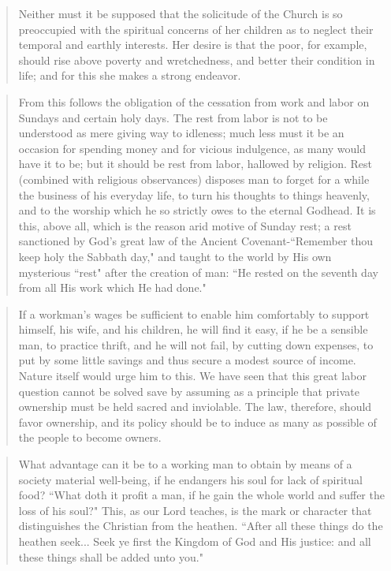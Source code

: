 \begin{quote}
	Neither must it be supposed that the solicitude of the Church is so preoccupied with the spiritual concerns of her children as to neglect their temporal and earthly interests. Her desire is that the poor, for example, should rise above poverty and wretchedness, and better their condition in life; and for this she makes a strong endeavor.
\end{quote}

\begin{quote}
	From this follows the obligation of the cessation from work and labor on Sundays and certain holy days. The rest from labor is not to be understood as mere giving way to idleness; much less must it be an occasion for spending money and for vicious indulgence, as many would have it to be; but it should be rest from labor, hallowed by religion. Rest (combined with religious observances) disposes man to forget for a while the business of his everyday life, to turn his thoughts to things heavenly, and to the worship which he so strictly owes to the eternal Godhead. It is this, above all, which is the reason arid motive of Sunday rest; a rest sanctioned by God's great law of the Ancient Covenant-``Remember thou keep holy the Sabbath day," and taught to the world by His own mysterious ``rest" after the creation of man: ``He rested on the seventh day from all His work which He had done."
\end{quote}

\begin{quote}
	If a workman's wages be sufficient to enable him comfortably to support himself, his wife, and his children, he will find it easy, if he be a sensible man, to practice thrift, and he will not fail, by cutting down expenses, to put by some little savings and thus secure a modest source of income. Nature itself would urge him to this. We have seen that this great labor question cannot be solved save by assuming as a principle that private ownership must be held sacred and inviolable. The law, therefore, should favor ownership, and its policy should be to induce as many as possible of the people to become owners.
\end{quote}

\begin{quote}
	What advantage can it be to a working man to obtain by means of a society material well-being, if he endangers his soul for lack of spiritual food? ``What doth it profit a man, if he gain the whole world and suffer the loss of his soul?" This, as our Lord teaches, is the mark or character that distinguishes the Christian from the heathen. ``After all these things do the heathen seek... Seek ye first the Kingdom of God and His justice: and all these things shall be added unto you."
\end{quote}

